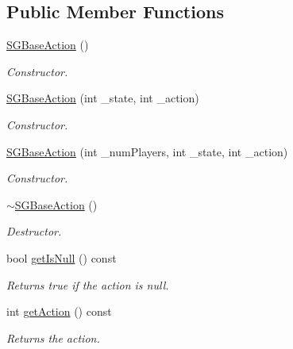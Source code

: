 \subsection*{Public Member Functions}
\begin{DoxyCompactItemize}
\item 
\hyperlink{classSGBaseAction_aa43b73172a811eb008f0762e405ae1a4}{S\+G\+Base\+Action} ()
\begin{DoxyCompactList}\small\item\em Constructor. \end{DoxyCompactList}\item 
\hyperlink{classSGBaseAction_a5f0a5c9866a41db2858d83a1f6aeed86}{S\+G\+Base\+Action} (int \+\_\+state, int \+\_\+action)
\begin{DoxyCompactList}\small\item\em Constructor. \end{DoxyCompactList}\item 
\hyperlink{classSGBaseAction_ad0e66183faa5ae137e075fe870f8cec9}{S\+G\+Base\+Action} (int \+\_\+num\+Players, int \+\_\+state, int \+\_\+action)
\begin{DoxyCompactList}\small\item\em Constructor. \end{DoxyCompactList}\item 
\mbox{\label{classSGBaseAction_a66ef87852d14dc7970005ab2b801053e}} 
\hyperlink{classSGBaseAction_a66ef87852d14dc7970005ab2b801053e}{$\sim$\+S\+G\+Base\+Action} ()
\begin{DoxyCompactList}\small\item\em Destructor. \end{DoxyCompactList}\item 
\mbox{\label{classSGBaseAction_a99657086faa3d9d5d00b9c56c1b5e7bb}} 
bool \hyperlink{classSGBaseAction_a99657086faa3d9d5d00b9c56c1b5e7bb}{get\+Is\+Null} () const
\begin{DoxyCompactList}\small\item\em Returns true if the action is null. \end{DoxyCompactList}\item 
\mbox{\label{classSGBaseAction_a91a8cce4f14293c47c7788d859284634}} 
int \hyperlink{classSGBaseAction_a91a8cce4f14293c47c7788d859284634}{get\+Action} () const
\begin{DoxyCompactList}\small\item\em Returns the action. \end{DoxyCompactList}\item 

\end{DoxyCompactItemize}
